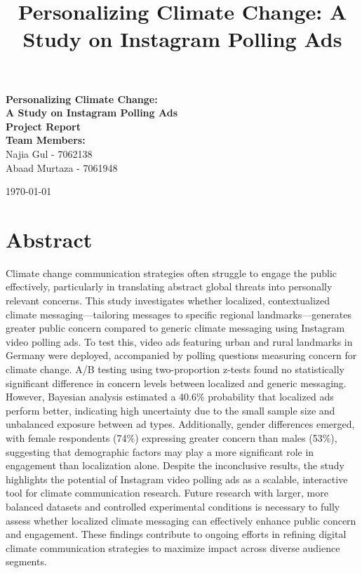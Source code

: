 \documentclass[a4paper,11pt]{article}
\title{Personalizing Climate Change: A Study on Instagram Polling Ads}
\begin{document}
\justifying
{}

\begin{titlepage}
    \centering
    {\Huge \textbf{Personalizing Climate Change:}\\[0.3cm] 
    \textbf{A Study on Instagram Polling Ads}}\\[1.5cm] %

    {\Large \textbf{Project Report}}\\[2cm] %

    \textbf{Team Members:}\\[0.5cm]
    {\Large Najia Gul - 7062138}\\[0.3cm]
    {\Large Abaad Murtaza - 7061948}\\[2cm]

    \vfill

    {\large \today}
\end{titlepage}

\renewcommand{\contentsname}{Table of Contents}
\tableofcontents
\newpage


\section{Abstract}
Climate change communication strategies often struggle to engage the public effectively, particularly in translating abstract global threats into personally relevant concerns. This study investigates whether localized, contextualized climate messaging—tailoring messages to specific regional landmarks—generates greater public concern compared to generic climate messaging using Instagram video polling ads. To test this, video ads featuring urban and rural landmarks in Germany were deployed, accompanied by polling questions measuring concern for climate change.
A/B testing using two-proportion z-tests found no statistically significant difference in concern levels between localized and generic messaging. However, Bayesian analysis estimated a 40.6\% probability that localized ads perform better, indicating high uncertainty due to the small sample size and unbalanced exposure between ad types. Additionally, gender differences emerged, with female respondents (74\%) expressing greater concern than males (53\%), suggesting that demographic factors may play a more significant role in engagement than localization alone.
Despite the inconclusive results, the study highlights the potential of Instagram video polling ads as a scalable, interactive tool for climate communication research. Future research with larger, more balanced datasets and controlled experimental conditions is necessary to fully assess whether localized climate messaging can effectively enhance public concern and engagement. These findings contribute to ongoing efforts in refining digital climate communication strategies to maximize impact across diverse audience segments.
\end{document}
